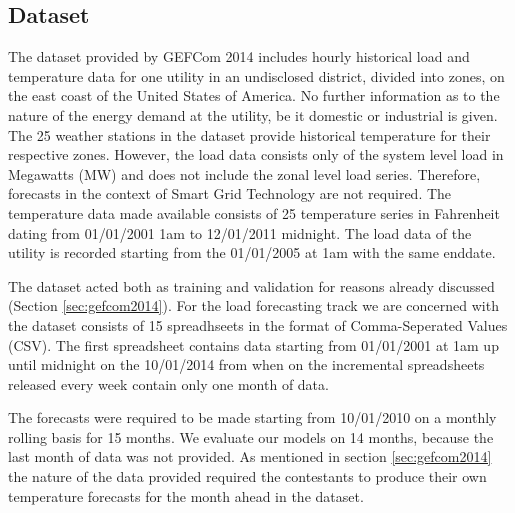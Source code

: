 \documentclass[conference]{IEEEtran}
\begin{document}
\subsection{Dataset}
\label{sec:dataset}
The dataset provided by GEFCom 2014 includes hourly historical load and temperature data for one utility in an undisclosed district, divided into zones, on the east coast of the United States of America. No further information as to the nature of the energy demand at the utility, be it domestic or industrial is given. The 25 weather stations in the dataset provide historical temperature for their respective zones. However, the load data consists only of the system level load in Megawatts (MW) and does not include the zonal level load series. Therefore, forecasts in the context of Smart Grid Technology are not required. The temperature data made available consists of 25 temperature series in Fahrenheit dating from 01/01/2001 1am to 12/01/2011 midnight. The load data of the utility is recorded starting from the 01/01/2005 at 1am with the same enddate.\par
The dataset acted both as training and validation for reasons already discussed (Section \ref{sec:gefcom2014}). For the load forecasting track we are concerned with the dataset consists of 15 spreadhseets in the format of Comma-Seperated Values (CSV). The first spreadsheet contains data starting from 01/01/2001 at 1am up until midnight on the 10/01/2014 from when on the incremental spreadsheets released every week contain only one month of data.\par
The forecasts were required to be made starting from 10/01/2010 on a monthly rolling basis for 15 months. We evaluate our models on 14 months, because the last month of data was not provided. As mentioned in section \ref{sec:gefcom2014} the nature of the data provided required the contestants to produce their own temperature forecasts for the month ahead in the dataset.\par
\end{document}
